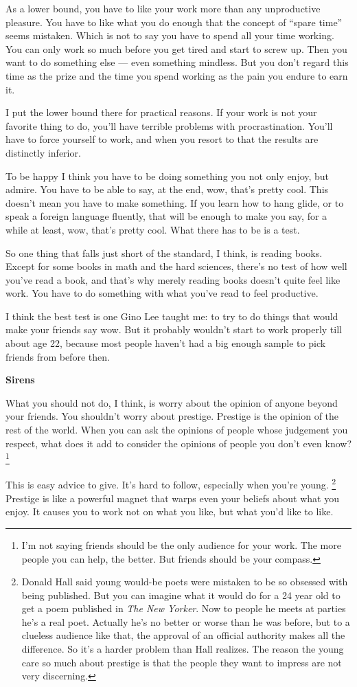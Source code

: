 \documentclass[12pt]{book}
\begin{document}
As a lower bound, you have to like your work more than any unproductive
pleasure. You have to like what you do enough that the concept of
``spare time'' seems mistaken. Which is not to say you have to spend all
your time working. You can only work so much before you get tired and
start to screw up. Then you want to do something else --- even something
mindless. But you don't regard this time as the prize and the time you
spend working as the pain you endure to earn it.

I put the lower bound there for practical reasons. If your work is not
your favorite thing to do, you'll have terrible problems with
procrastination. You'll have to force yourself to work, and when you
resort to that the results are distinctly inferior.

To be happy I think you have to be doing something you not only enjoy,
but admire. You have to be able to say, at the end, wow, that's pretty
cool. This doesn't mean you have to make something. If you learn how to
hang glide, or to speak a foreign language fluently, that will be enough
to make you say, for a while at least, wow, that's pretty cool. What
there has to be is a test.

So one thing that falls just short of the standard, I think, is reading
books. Except for some books in math and the hard sciences, there's no
test of how well you've read a book, and that's why merely reading books
doesn't quite feel like work. You have to do something with what you've
read to feel productive.

I think the best test is one Gino Lee taught me: to try to do things
that would make your friends say wow. But it probably wouldn't start to
work properly till about age 22, because most people haven't had a big
enough sample to pick friends from before then.

\textbf{Sirens}

What you should not do, I think, is worry about the opinion of anyone
beyond your friends. You shouldn't worry about prestige. Prestige is the
opinion of the rest of the world. When you can ask the opinions of
people whose judgement you respect, what does it add to consider the
opinions of people you don't even know? \footnote{I'm not saying friends should be the only audience for your
work. The more people you can help, the better. But friends should be
your compass.}

This is easy advice to give. It's hard to follow, especially when you're
young. \footnote{Donald Hall said young would-be poets were mistaken to be so
obsessed with being published. But you can imagine what it would do for
a 24 year old to get a poem published in \emph{The New Yorker}. Now to
people he meets at parties he's a real poet. Actually he's no better or
worse than he was before, but to a clueless audience like that, the
approval of an official authority makes all the difference. So it's a
harder problem than Hall realizes. The reason the young care so much
about prestige is that the people they want to impress are not very
discerning.} Prestige is like a powerful magnet that
warps even your beliefs about what you enjoy. It causes you to work not
on what you like, but what you'd like to like.
\end{document}

